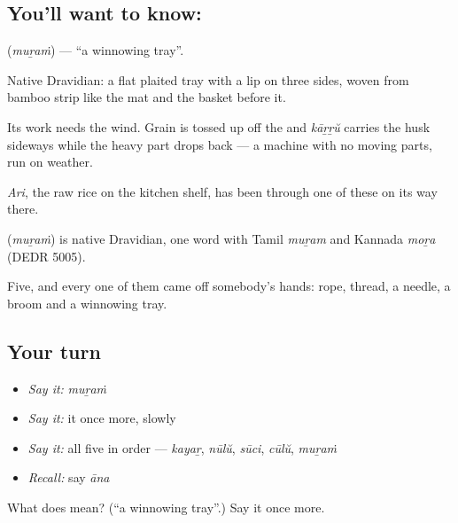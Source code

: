 \subsection*{You'll want to know: }
\textbf{} (\emph{muṟaṁ}) — \textquotedblleft{}a winnowing tray\textquotedblright{}.

Native Dravidian: a flat plaited tray with a lip on three sides, woven from bamboo strip like the mat and the basket before it.

Its work needs the wind. Grain is tossed up off the  and \emph{kāṟṟŭ} carries the husk sideways while the heavy part drops back — a machine with no moving parts, run on weather.

\emph{Ari}, the raw rice on the kitchen shelf, has been through one of these on its way there.

\begin{cousinweb}
\textbf{} (\emph{muṟaṁ}) is native Dravidian, one word with Tamil \emph{muṟam} and Kannada \emph{moṟa} (DEDR 5005).
\end{cousinweb}

\begin{grammarlens}[title={What you've built}]
Five, and every one of them came off somebody's hands: rope, thread, a needle, a broom and a winnowing tray.
\end{grammarlens}

\subsection*{Your turn}
\begin{itemize}
\raggedright
  \item \emph{Say it:} \emph{muṟaṁ}
  \item \emph{Say it:} it once more, slowly
  \item \emph{Say it:} all five in order — \emph{kayaṟ}, \emph{nūlŭ}, \emph{sūci}, \emph{cūlŭ}, \emph{muṟaṁ}
  \item \emph{Recall:} say \emph{āna}
\end{itemize}

\begin{tcolorbox}[breakable,colback=teal!4,colframe=teal!35!black,title={Before you move on}]
What does  mean? (\textquotedblleft{}a winnowing tray\textquotedblright{}.) Say it once more.
\end{tcolorbox}
